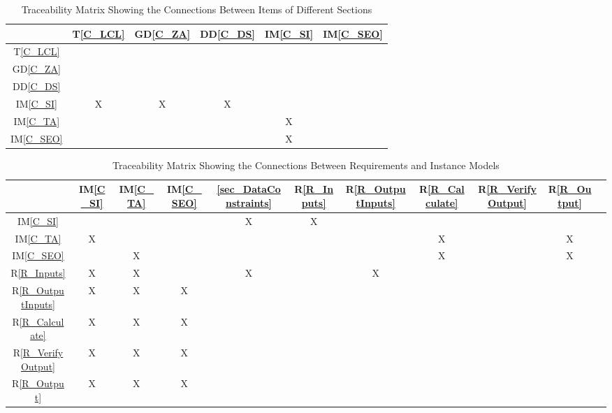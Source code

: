 \documentclass[12pt]{article}
\newcommand{\dref}[1]{GD\ref{#1}}
\newcommand{\ddref}[1]{DD\ref{#1}}
\newcommand{\tref}[1]{T\ref{#1}}
\newcommand{\iref}[1]{IM\ref{#1}}
\newcommand{\rref}[1]{R\ref{#1}}
\begin{document}
\begin{table}[h!]
\centering
\begin{tabular}{|c|c|c|c|c|c|}
\hline        
	& \tref{C_LCL}& \dref{C_ZA} & \ddref{C_DS}& \iref{C_SI} &\iref{C_SEO} \\
\hline
\tref{C_LCL}        &    &    &     &    &     \\ \hline
\dref{C_ZA}         &    &    &     &    &      \\ \hline
\ddref{C_DS}       &    &    &     &    &     \\ \hline
\iref{C_SI}           & X & X & X  &    &       \\ \hline
\iref{C_TA}          &    &     &     & X &      \\ \hline
\iref{C_SEO}       &    &     &     & X &        \\ \hline


\hline
\end{tabular}
\caption{Traceability Matrix Showing the Connections Between Items of Different Sections}
\label{Table:trace}
\end{table}

\begin{table}[h!]
\centering
\begin{tabular}{|c|c|c|c|c|c|c|c|c|c|c|}
\hline
	& \iref{C_SI}&\iref{C_TA}  & \iref{C_SEO}& \ref{sec_DataConstraints}& \rref{R_Inputs}& \rref{R_OutputInputs} & \rref{R_Calculate}& \rref{R_VerifyOutput}& \rref{R_Output}\\

\hline
\iref{C_SI}            			&    &    &    & X & X &     &     &     &     \\ \hline
\iref{C_TA}         				& X &    &    &    &    &     & X  &     &X \\ \hline
\iref{C_SEO}           		&    & X &    &    &    &     & X  &     &X \\ \hline
\rref{R_Inputs}    				& X & X &    & X &    & X  &     &     &     \\ \hline
\rref{R_OutputInputs}  & X & X & X &    &    &     &     &     &     \\ \hline
\rref{R_Calculate}  		& X & X & X &    &    &     &     &     &     \\ \hline
\rref{R_VerifyOutput}  & X & X & X &    &    &     &      &     &    \\ \hline 
\rref{R_Output}       		& X & X & X &    &    &     &      &     &    \\ \hline
\hline
\end{tabular}
\caption{Traceability Matrix Showing the Connections Between Requirements and Instance Models}
\label{Table:R_trace}
\end{table}
\end{document}
